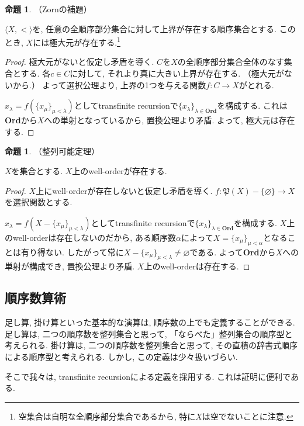 \documentclass[a4paper, twoside]{bxjsarticle}
\theoremstyle{definition}
\newtheorem{prop}[thm]{命題}
\begin{document}
    \begin{prop}
        （Zornの補題）
        
        $\langle X, <\rangle$を, 任意の全順序部分集合に対して上界が存在する順序集合とする. このとき, $X$には極大元が存在する.\footnote{空集合は自明な全順序部分集合であるから, 特に$X$は空でないことに注意.}
    \end{prop}
    \begin{proof}
        極大元がないと仮定し矛盾を導く. $C$を$X$の全順序部分集合全体のなす集合とする. 各$c\in C$に対して, それより真に大きい上界が存在する. （極大元がないから.） よって選択公理より, 上界の1つを与える関数$f\colon C\to X$がとれる.
        
        $x_\lambda = f(\{x_\mu\}_{\mu<\lambda})$としてtransfinite recursionで$\{x_\lambda\}_{\lambda\in\textbf{Ord}}$を構成する. これは\textbf{Ord}から$X$への単射となっているから, 置換公理より矛盾. よって, 極大元は存在する.
    \end{proof}
    \begin{prop}
        （整列可能定理）
        
        $X$を集合とする. $X$上のwell-orderが存在する.
    \end{prop}
    \begin{proof}
        $X$上にwell-orderが存在しないと仮定し矛盾を導く. $f\colon \mathfrak{P}(X)-\{\varnothing\}\to X$を選択関数とする.
        
        $x_\lambda = f(X-\{x_\mu\}_{\mu<\lambda})$としてtransfinite recursionで$\{x_\lambda\}_{\lambda\in\textbf{Ord}}$を構成する. $X$上のwell-orderは存在しないのだから, ある順序数$\alpha$によって$X=\{x_\mu\}_{\mu<\alpha}$となることは有り得ない. したがって常に$X-\{x_\mu\}_{\mu<\lambda} \neq \varnothing$である. よって\textbf{Ord}から$X$への単射が構成でき, 置換公理より矛盾. $X$上のwell-orderは存在する.
    \end{proof}
    
    \subsection{順序数算術}
        足し算, 掛け算といった基本的な演算は, 順序数の上でも定義することができる. 足し算は, 二つの順序数を整列集合と思って, 「ならべた」整列集合の順序型と考えられる. 掛け算は, 二つの順序数を整列集合と思って, その直積の辞書式順序による順序型と考えられる. しかし, この定義は少々扱いづらい.
        
        そこで我々は, transfinite recursionによる定義を採用する. これは証明に便利である.
        
\end{document}
